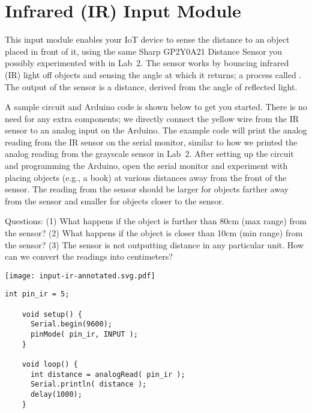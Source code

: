 
\clearpage
\section{Infrared (IR) Input Module}
\label{sec-input-ir}

This input module enables your IoT device to sense the distance to an
object placed  in front of it, using the same Sharp
GP2Y0A21 Distance Sensor you possibly experimented with in Lab~2. The
sensor works by bouncing infrared (IR) light off objects and sensing the
angle at which it returns; a process called . The
output of the sensor is a distance, derived from the angle of reflected
light.

A sample circuit and Arduino code is shown below to get you started.
There is no need for any extra components; we directly connect the yellow
wire from the IR sensor to an analog input on the Arduino. The example
code will print the analog reading from the IR sensor on the serial
monitor, similar to how we printed the analog reading from the grayscale
sensor in Lab~2. After setting up the circuit and programming the
Arduino, open the serial monitor and experiment with placing objects
(e.g., a book) at various distances away from the front of the sensor.
The reading from the sensor should be larger for objects farther away
from the sensor and smaller for objects closer to the sensor.

Questions: (1) What happens if the object is further than 80cm (max
range) from the sensor? (2) What happens if the object is closer than
10cm (min range) from the sensor? (3) The sensor is not outputting
distance in any particular unit. How can we convert the readings into
centimeters?

\vspace{0.1in}
\begin{minipage}[t]{0.49\tw}
  \vspace{0pt}

  \texttt{[image: input-ir-annotated.svg.pdf]}
\end{minipage}
\hfill
\begin{minipage}[t]{0.49\tw}
  \vspace{0.1in}
  \begin{Verbatim}[gobble=3,fontsize=\small]
    int pin_ir = 5;

    void setup() {
      Serial.begin(9600);
      pinMode( pin_ir, INPUT );
    }

    void loop() {
      int distance = analogRead( pin_ir );
      Serial.println( distance );
      delay(1000);
    }
  \end{Verbatim}
\end{minipage}

